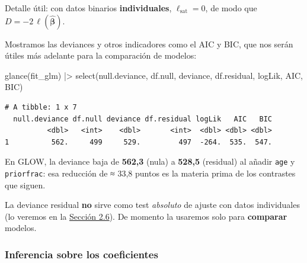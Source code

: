 \documentclass[
  letterpaper,
  DIV=11,
  numbers=noendperiod]{scrartcl}
\newenvironment{Shaded}{\begin{snugshade}}{\end{snugshade}}
\newcommand{\FunctionTok}[1]{\textcolor[rgb]{0.28,0.35,0.67}{#1}}
\newcommand{\NormalTok}[1]{\textcolor[rgb]{0.00,0.23,0.31}{#1}}
\newcommand{\SpecialCharTok}[1]{\textcolor[rgb]{0.37,0.37,0.37}{#1}}
\begin{document}
\begin{tcolorbox}[enhanced jigsaw, breakable, colframe=quarto-callout-tip-color-frame, left=2mm, arc=.35mm, colbacktitle=quarto-callout-tip-color!10!white, toprule=.15mm, colback=white, coltitle=black, rightrule=.15mm, opacitybacktitle=0.6, title=\textcolor{quarto-callout-tip-color}{\faLightbulb}\hspace{0.5em}{Tip}, titlerule=0mm, toptitle=1mm, bottomtitle=1mm, leftrule=.75mm, bottomrule=.15mm, opacityback=0]

Detalle útil: con datos binarios \textbf{individuales},
\(\ell_{\text{sat}}=0\), de modo que
\(D=-2\,\ell(\hat{\boldsymbol\beta})\).

\end{tcolorbox}

Mostramos las deviances y otros indicadores como el AIC y BIC, que nos
serán útiles más adelante para la comparación de modelos:

\begin{Shaded}
\begin{Highlighting}[]
\FunctionTok{glance}\NormalTok{(fit\_glm) }\SpecialCharTok{|\textgreater{}}
  \FunctionTok{select}\NormalTok{(null.deviance, df.null, deviance, df.residual, logLik, AIC, BIC)}
\end{Highlighting}
\end{Shaded}

\begin{verbatim}
# A tibble: 1 x 7
  null.deviance df.null deviance df.residual logLik   AIC   BIC
          <dbl>   <int>    <dbl>       <int>  <dbl> <dbl> <dbl>
1          562.     499     529.         497  -264.  535.  547.
\end{verbatim}

En GLOW, la deviance baja de \textbf{562,3} (nula) a \textbf{528,5}
(residual) al añadir \texttt{age} y \texttt{priorfrac}: esa reducción de
≈ 33,8 puntos es la materia prima de los contrastes que siguen.

La deviance residual \textbf{no} sirve como test \emph{absoluto} de
ajuste con datos individuales (lo veremos en la
\protect\hyperlink{sec-u12-diagnostico}{Sección 2.6}). De momento la
usaremos solo para \textbf{comparar} modelos.

\hypertarget{inferencia-sobre-los-coeficientes}{%
\subsubsection{Inferencia sobre los
coeficientes}\label{inferencia-sobre-los-coeficientes}}
\end{document}
